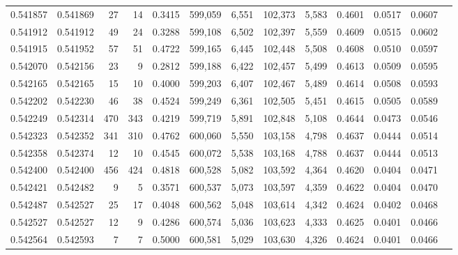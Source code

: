 \begin{tabular}{rrrrrrrrrrrrr}
0.541857 & 0.541869 &    27 &    14 &                                     0.3415 & 599,059 &   6,551 & 102,373 &   5,583 & 0.4601 & 0.0517 & 0.0607 \\
0.541912 & 0.541912 &    49 &    24 &                                     0.3288 & 599,108 &   6,502 & 102,397 &   5,559 & 0.4609 & 0.0515 & 0.0602 \\
0.541915 & 0.541952 &    57 &    51 &                                     0.4722 & 599,165 &   6,445 & 102,448 &   5,508 & 0.4608 & 0.0510 & 0.0597 \\
0.542070 & 0.542156 &    23 &     9 &                                     0.2812 & 599,188 &   6,422 & 102,457 &   5,499 & 0.4613 & 0.0509 & 0.0595 \\
0.542165 & 0.542165 &    15 &    10 &                                     0.4000 & 599,203 &   6,407 & 102,467 &   5,489 & 0.4614 & 0.0508 & 0.0593 \\
0.542202 & 0.542230 &    46 &    38 &                                     0.4524 & 599,249 &   6,361 & 102,505 &   5,451 & 0.4615 & 0.0505 & 0.0589 \\
0.542249 & 0.542314 &   470 &   343 &                                     0.4219 & 599,719 &   5,891 & 102,848 &   5,108 & 0.4644 & 0.0473 & 0.0546 \\
0.542323 & 0.542352 &   341 &   310 &                                     0.4762 & 600,060 &   5,550 & 103,158 &   4,798 & 0.4637 & 0.0444 & 0.0514 \\
0.542358 & 0.542374 &    12 &    10 &                                     0.4545 & 600,072 &   5,538 & 103,168 &   4,788 & 0.4637 & 0.0444 & 0.0513 \\
0.542400 & 0.542400 &   456 &   424 &                                     0.4818 & 600,528 &   5,082 & 103,592 &   4,364 & 0.4620 & 0.0404 & 0.0471 \\
0.542421 & 0.542482 &     9 &     5 &                                     0.3571 & 600,537 &   5,073 & 103,597 &   4,359 & 0.4622 & 0.0404 & 0.0470 \\
0.542487 & 0.542527 &    25 &    17 &                                     0.4048 & 600,562 &   5,048 & 103,614 &   4,342 & 0.4624 & 0.0402 & 0.0468 \\
0.542527 & 0.542527 &    12 &     9 &                                     0.4286 & 600,574 &   5,036 & 103,623 &   4,333 & 0.4625 & 0.0401 & 0.0466 \\
0.542564 & 0.542593 &     7 &     7 &                                     0.5000 & 600,581 &   5,029 & 103,630 &   4,326 & 0.4624 & 0.0401 & 0.0466 \\

\end{tabular}
